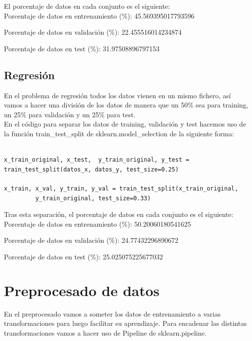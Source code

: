 \documentclass[12pt]{article}
\begin{document}
El porcentaje de datos en cada conjunto es el siguiente:\\

Porcentaje de datos en entrenamiento (\%):  45.569395017793596

Porcentaje de datos en validación (\%):  22.455516014234874

Porcentaje de datos en test (\%):  31.97508896797153

\subsection{Regresión}

En el problema de regresión todos los datos vienen en un mismo fichero, así vamos a hacer una división de los datos de manera que un 50\% sea para training, un 25\% para validación y un 25\% para test.\\

En el código para separar los datos de training, validación y test hacemos uso de la función 
train\_test\_split de sklearn.model\_selection de la siguiente forma:

\begin{lstlisting}[frame=single]
        
x_train_original, x_test,  y_train_original, y_test = 
train_test_split(datos_x, datos_y, test_size=0.25)

x_train, x_val, y_train, y_val = train_test_split(x_train_original,
		 y_train_original, test_size=0.33)

\end{lstlisting}

Tras esta separación, el porcentaje de datos en cada conjunto es el siguiente:\\

Porcentaje de datos en entrenamiento (\%):  50.20060180541625

Porcentaje de datos en validación (\%):  24.77432296890672

Porcentaje de datos en test (\%):  25.025075225677032

\clearpage

\section{Preprocesado de datos}

En el preprocesado vamos a someter los datos de entrenamiento a varias transformaciones para luego facilitar su aprendizaje. Para encadenar las distintas transformaciones vamos a hacer uso de Pipeline de sklearn.pipeline.
\end{document}
